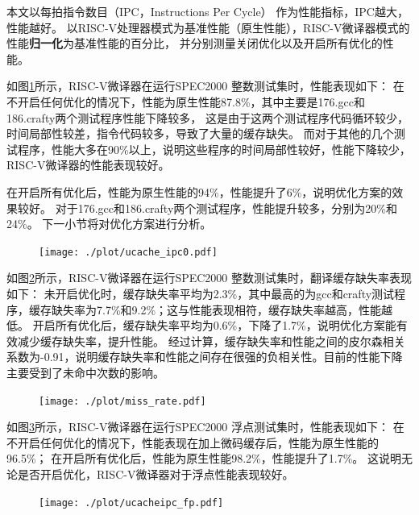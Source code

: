 本文以每拍指令数目（IPC，Instructions Per Cycle）
作为性能指标，IPC越大，性能越好。
以RISC-V处理器模式为基准性能（原生性能），RISC-V微译器模式的性能\textbf{归一化}为基准性能的百分比，
并分别测量关闭优化以及开启所有优化的性能。

如图\ref{img:ipc}所示，RISC-V微译器在运行SPEC2000 整数测试集时，性能表现如下：
在不开启任何优化的情况下，性能为原生性能87.8\%，其中主要是176.gcc和186.crafty两个测试程序性能下降较多，
这是由于这两个测试程序代码循环较少，时间局部性较差，指令代码较多，导致了大量的缓存缺失。
而对于其他的几个测试程序，性能大多在90\%以上，说明这些程序的时间局部性较好，性能下降较少，RISC-V微译器的性能表现较好。

在开启所有优化后，性能为原生性能的94\%，性能提升了6\%，说明优化方案的效果较好。
对于176.gcc和186.crafty两个测试程序，性能提升较多，分别为20\%和24\%。
下一小节将对优化方案进行分析。


\begin{figure}[!htbp]
  \centering
  \texttt{[image: ./plot/ucache\_ipc0.pdf]}
  \label{img:ipc}
\end{figure}

如图\ref{img:miss_rate}所示，RISC-V微译器在运行SPEC2000 整数测试集时，翻译缓存缺失率表现如下：
未开启优化时，缓存缺失率平均为2.3\%，其中最高的为gcc和crafty测试程序，缓存缺失率为7.7\%和9.2\%；这与性能表现相符，缓存缺失率越高，性能越低。
开启所有优化后，缓存缺失率平均为0.6\%，下降了1.7\%，说明优化方案能有效减少缓存缺失率，提升性能。
经过计算，缓存缺失率和性能之间的皮尔森相关系数为-0.91，说明缓存缺失率和性能之间存在很强的负相关性。目前的性能下降主要受到了未命中次数的影响。

\begin{figure}[!htbp]
  \centering
  \texttt{[image: ./plot/miss\_rate.pdf]}
  \label{img:miss_rate}
\end{figure}

如图\ref{img:ipc_fp}所示，RISC-V微译器在运行SPEC2000 浮点测试集时，性能表现如下：
在不开启任何优化的情况下，性能表现在加上微码缓存后，性能为原生性能的96.5\%；
在开启所有优化后，性能为原生性能98.2\%，性能提升了1.7\%。
这说明无论是否开启优化，RISC-V微译器对于浮点性能表现较好。


\begin{figure}[!htbp]
  \centering
  \texttt{[image: ./plot/ucacheipc\_fp.pdf]}
  \label{img:ipc_fp}
\end{figure}


